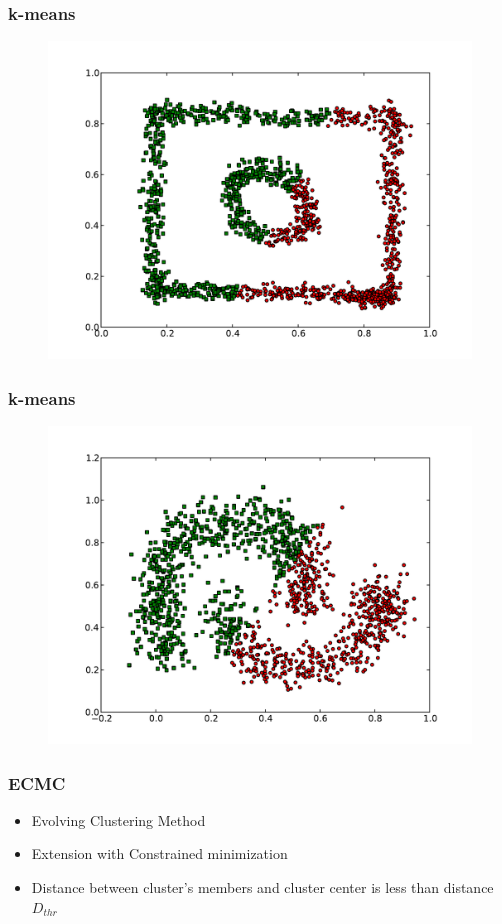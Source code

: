 \documentclass{beamer}
\begin{document}
\begin{frame}
\frametitle{k-means}
    \begin{figure}[]
    \includegraphics[scale=0.5]{kmeans_circle-weird.pdf}
    \end{figure}
\end{frame}

\begin{frame}
\frametitle{k-means}
    \begin{figure}[]
    \includegraphics[scale=0.5]{kmeans_half-moons.pdf}
    \end{figure}
\end{frame}



\begin{frame}
\frametitle{ECMC}
    \begin{itemize}
	\item Evolving Clustering Method
	\item Extension with Constrained minimization
    	\item Distance between cluster's members and cluster center is less than distance $D_{thr}$
    \end{itemize}
\end{frame}
\end{document}
